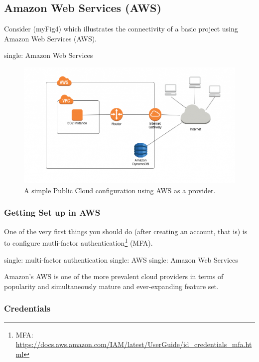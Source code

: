 \hypertarget{amazon-web-services-aws}{%
\subsection{Amazon Web Services (AWS)}\label{amazon-web-services-aws}}

Consider ({myFig4}) which illustrates the connectivity of a basic
project using Amazon Web Services (AWS).

single: Amazon Web Services

\begin{figure}
\centering
\includegraphics{../images/ddb-no-vpc-endpoint-1024x561.png}
\caption{A simple Public Cloud configuration using AWS as a provider.}
\end{figure}

\hypertarget{getting-set-up-in-aws}{%
\subsubsection{Getting Set up in AWS}\label{getting-set-up-in-aws}}

One of the very first things you should do (after creating an account,
that is) is to configure mutli-factor authentication\footnote{MFA:
  \url{https://docs.aws.amazon.com/IAM/latest/UserGuide/id_credentials_mfa.html}}
(MFA).

single: multi-factor authentication single: AWS single: Amazon Web
Services

Amazon's AWS is one of the more prevalent cloud providers in terms of
popularity and simultaneously mature and ever-expanding feature set.

\hypertarget{credentials}{%
\subsubsection{Credentials}\label{credentials}}

